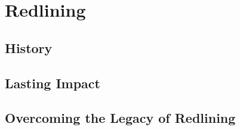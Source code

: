 \chapter{Redlining}

\section{History}



\section{Lasting Impact}



\section{Overcoming the Legacy of Redlining}


